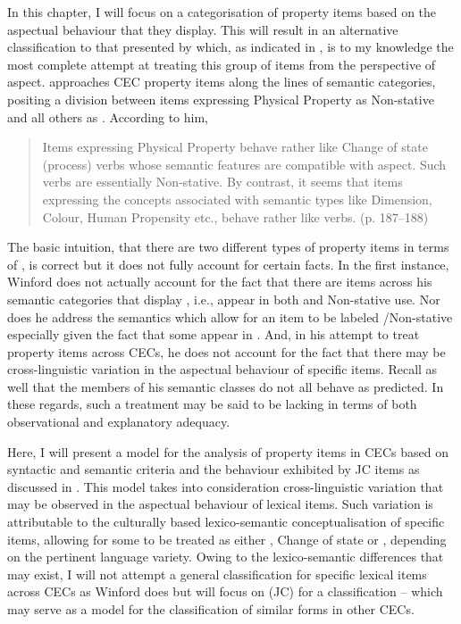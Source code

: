 In this chapter, I will focus on a categorisation of property items based on the aspectual behaviour that they display. This will result in an alternative classification to that presented by \citet{Winford1993} which, as indicated in , is to my knowledge the most complete attempt at treating this group of items from the perspective of aspect. \citet{Winford1993} approaches CEC property items along the lines of  semantic categories, positing a division between items expressing Physical Property as Non-stative and all others as . According to him, 

\begin{quote}Items expressing Physical Property behave rather like Change of state (process) verbs whose semantic features are compatible with  aspect. Such verbs are essentially Non-stative. By contrast, it seems that items expressing the concepts associated with semantic types like Dimension, Colour, Human Propensity etc., behave rather like  verbs. (p. 187--188)\end{quote}

The basic intuition, that there are two different types of property items in terms of , is correct but it does not fully account for certain facts. In the first instance, Winford does not actually account for the fact that there are items across his semantic categories that display , i.e., appear in both  and Non-stative use. Nor does he address the semantics which allow for an item to be labeled \slash Non-stative especially given the fact that some appear in . And, in his attempt to treat property items across CECs, he does not account for the fact that there may be cross-linguistic variation in the aspectual behaviour of specific items. Recall as well that the members of his semantic classes do not all behave as predicted. In these regards, such a treatment may be said to be lacking in terms of both observational and explanatory adequacy.

Here, I will present a model for the analysis of property items in CECs based on syntactic and semantic criteria and the behaviour exhibited by JC items as discussed in . This model takes into consideration cross-linguistic variation that may be observed in the aspectual behaviour of lexical items. Such variation is attributable to the culturally based lexico-semantic conceptualisation of specific items, allowing for some to be treated as either , Change of state or , depending on the pertinent language variety. Owing to the lexico-semantic differences that may exist, I will not attempt a general classification for specific lexical items across CECs as Winford does but will focus on  (JC) for a classification -- which may serve as a model for the classification of similar forms in other CECs. 



